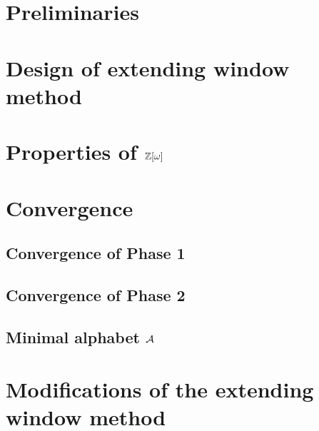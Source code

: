 \documentclass[11pt,a4paper]{report}	%
\theoremstyle{definition}
\begin{document}
\tableofcontents



\chapter{Preliminaries}
	



\chapter{Design of extending window method}
	

\chapter{\texorpdfstring{Properties of $\mathbb{Z}[\omega]$}{Properties of Z[omega]}}
	
	
		
	
\chapter{Convergence}


	\section{Convergence of Phase 1}
	
	

	\section{Convergence of Phase 2}
	
	
	\section{Minimal alphabet $\mathcal{A}$}
	


\chapter{Modifications of the extending window method}
\end{document}
